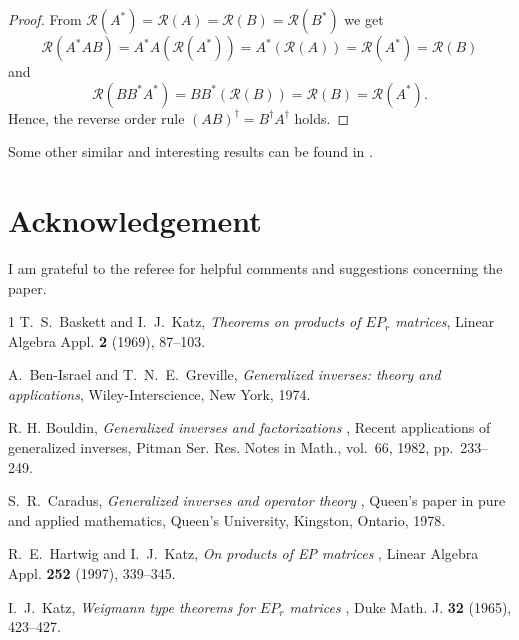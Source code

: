 \documentclass{proc-l}
\theoremstyle{plain}
\theoremstyle{remark}
\theoremstyle{definition}
\newcommand{\R}{\mathcal{R}}
\begin{document}
\begin{proof} From $\R (A^{*})=\R (A)=\R (B)=\R (B^{*})$ we get
\begin{equation*}\R (A^{*}AB)=A^{*}A(\R (A^{*}))=A^{*}(\R (A))=\R 
(A^{*})=\R (B)\end{equation*}
and
\begin{equation*}\R (BB^{*}A^{*})=BB^{*}(\R (B))=\R (B)=\R 
(A^{*}).\end{equation*}
Hence, the reverse order rule $(AB)^{\dag }=B^{\dag }A^{\dag }$ 
holds.\end{proof}

Some other similar and interesting results can be found in \cite{1}.

\section*{Acknowledgement}

I am grateful to the referee for helpful comments and suggestions concerning
the paper.

\begin{thebibliography}{1}
 T.~S.~Baskett and I.~J.~Katz, \emph{Theorems on products of $%
EP_{r}$ matrices}, Linear Algebra Appl. \textbf{2} (1969), 87--103. %

 A.~Ben-Israel and T.~N.~E.~Greville, \emph{Generalized
inverses: theory and applications}, Wiley-In\-ter\-sci\-en\-ce, New York,
1974. 

 R. H. Bouldin, \emph{Generalized inverses and factorizations}%
, Recent applications of generalized inverses, Pitman Ser. Res. Notes in
Math., vol.~66, 1982, pp.~233--249. 

 S.~R.~Caradus, \emph{Generalized inverses and operator theory}%
, Queen's paper in pure and applied mathematics, Queen's University,
Kingston, Ontario, 1978. 

 R.~E.~Hartwig and I.~J.~Katz, \emph{On products of EP matrices%
}, Linear Algebra Appl. \textbf{252} (1997), 339--345. 

 I.~J.~Katz, \emph{Weigmann type theorems for $EP_{r}$ matrices%
}, Duke Math. J. \textbf{32} (1965), 423--427. 
\end{thebibliography}
\end{document}
